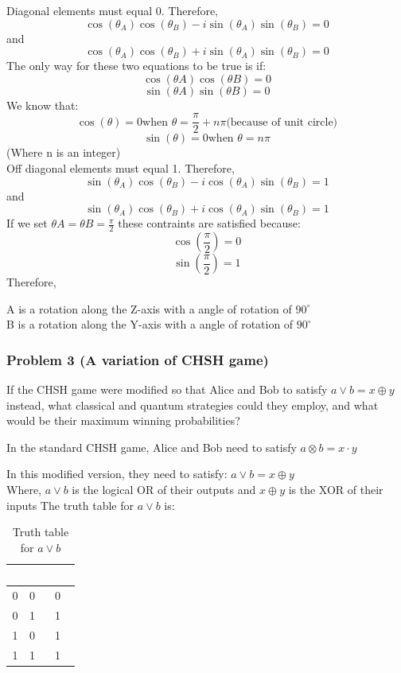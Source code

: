 \documentclass[12pt]{article}
\begin{document}
Diagonal elements must equal 0. Therefore,
\[
    \cos(\theta_A)\cos(\theta_B) - i\sin(\theta_A)\sin(\theta_B) = 0
\]
and
\[
    \cos(\theta_A)\cos(\theta_B) + i\sin(\theta_A)\sin(\theta_B) = 0
\]
The only way for these two equations to be true is if:
\[
    \cos(\theta A) \cos(\theta B) = 0
\]
\[
    \sin(\theta A) \sin(\theta B) = 0
\]
We know that:
\[
\cos(\theta) = 0 \text{when } \theta = \frac{\pi}{2} + n\pi \text{(because of unit circle)}
\]
\[
    \sin(\theta) = 0 \text{when } \theta = n\pi
\]
(Where n is an integer) \\
Off diagonal elements must equal 1. Therefore,
\[
    \sin(\theta_A)\cos(\theta_B) - i\cos(\theta_A)\sin(\theta_B) = 1
\]
and
\[
    \sin(\theta_A)\cos(\theta_B) + i\cos(\theta_A)\sin(\theta_B) = 1
\]
If we set $\theta A = \theta B = \frac{\pi}{2}$ these contraints are satisfied because:
\[
\cos (\frac{\pi}{2}) = 0 
\]
\[
\sin (\frac{\pi}{2}) = 1
\]
Therefore, 

A is a rotation along the Z-axis with a angle of rotation of $90^\circ$ \\

B is a rotation along the Y-axis with a angle of rotation of $90^\circ$

\subsubsection*{Problem 3 (A variation of CHSH game)}
If the CHSH game were modified so that Alice and Bob to satisfy $a \vee b = x \oplus y$ instead, what classical and quantum strategies could they employ, and what would be their maximum winning probabilities?

In the standard CHSH game, Alice and Bob need to satisfy $a\otimes b = x \cdot  y$

In this modified version, they need to satisfy:
$a \vee b = x \oplus y$
\\
Where, $a \vee b$ is the logical OR of their outputs and $x \oplus y$ is the XOR of their inputs
The truth table for $a \vee b$ is:
\begin{table}[htbp]
    \centering
    \begin{tabular}{|c|c|c|}
        \hline
        \rowcolor[HTML]{333333} 
        \textcolor{white}{$x$} & \textcolor{white}{$y$} & \textcolor{white}{$a \vee b$} \\
        \hline
        0 & 0 & 0 \\
        \hline
        0 & 1 & 1 \\
        \hline
        1 & 0 & 1 \\
        \hline
        1 & 1 & 1 \\
        \hline
    \end{tabular}
    \caption{Truth table for $a \vee b$}
    \label{tab:chsh}
\end{table}
\end{document}
